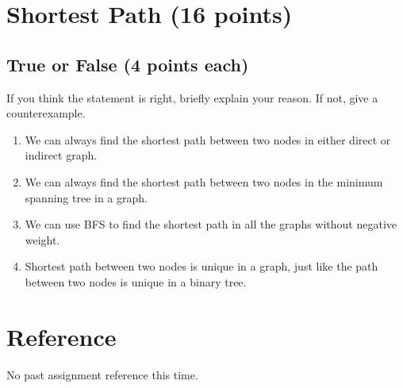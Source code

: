 \documentclass[11pt]{exam}
\begin{document}
\section{Shortest Path (16 points)}
\subsection{True or False (4 points each)}
If you think the statement is right, briefly explain your reason. If not, give a counterexample.
\begin{enumerate}[1)]
    \item We can always find the shortest path between two nodes in either direct or indirect graph.
    \begin{solution}
    \end{solution}
    \item We can always find the shortest path between two nodes in the minimum spanning tree in a graph.
    \begin{solution}
    \end{solution}
    \item We can use BFS to find the shortest path in all the graphs without negative weight.
    \begin{solution}
    \end{solution}
    \item Shortest path between two nodes is unique in a graph, just like the path between two nodes is unique in a binary tree.
    \begin{solution}
    \end{solution}
\end{enumerate}

\section*{Reference}

No past assignment reference this time.
\end{document}
